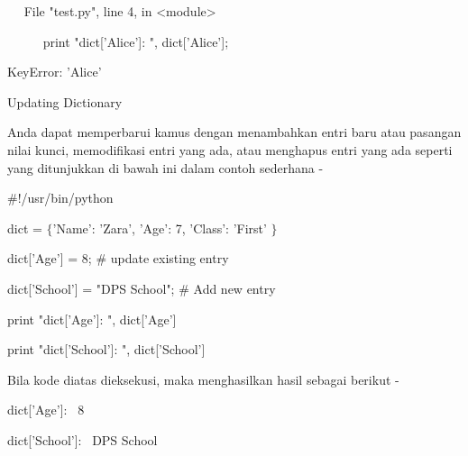  \hspace*{0.5in} ~~ File "test.py", line 4, in <module> \par
\noindent 
~~~~~  \hspace*{0.5in}  \hspace*{0.5in} print "dict['Alice']: ", dict['Alice']; \par
\noindent 
 \hspace*{0.5in}  \hspace*{0.5in} KeyError: 'Alice' \par
\vspace{12pt}
\vspace{12pt}
\noindent 
Updating Dictionary \par
\noindent 
Anda dapat memperbarui kamus dengan menambahkan entri baru atau pasangan nilai kunci, memodifikasi entri yang ada, atau menghapus entri yang ada seperti yang ditunjukkan di bawah ini dalam contoh sederhana - \par
\noindent 
 \hspace*{0.5in}  $  \#  $!/usr/bin/python \par
\vspace{12pt}
\noindent 
 \hspace*{0.5in} dict =  $  \{  $'Name': 'Zara', 'Age': 7, 'Class': 'First' $  \}  $ \par
\vspace{12pt}
\noindent 
 \hspace*{0.5in} dict['Age'] = 8;  $  \#  $ update existing entry \par
\noindent 
 \hspace*{0.5in} dict['School'] = "DPS School";  $  \#  $ Add new entry \par
\vspace{12pt}
\vspace{12pt}
\noindent 
 \hspace*{0.5in} print "dict['Age']: ", dict['Age'] \par
\noindent 
 \hspace*{0.5in} print "dict['School']: ", dict['School'] \par
\noindent 
Bila kode diatas dieksekusi, maka menghasilkan hasil sebagai berikut - \par
\noindent 
 \hspace*{0.5in} dict['Age']:~ 8 \par
\noindent 
 \hspace*{0.5in} dict['School']:~ DPS School \par
\vspace{12pt}
